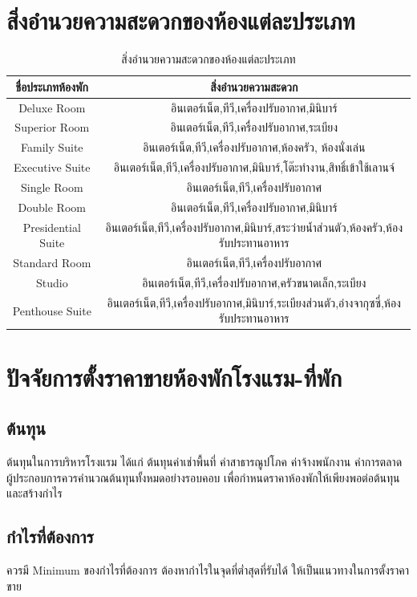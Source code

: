 \documentclass{report}
\begin{document}
\section{สิ่งอำนวยความสะดวกของห้องแต่ละประเภท}
\begin{table}[h!]
\centering
\begin{tabular}{|c|c|}
\hline
ชื่อประเภทห้องพัก & สิ่งอำนวยความสะดวก \\
\hline
Deluxe Room & อินเตอร์เน็ต,ทีวี,เครื่องปรับอากาศ,มินิบาร์  \\
Superior Room & อินเตอร์เน็ต,ทีวี,เครื่องปรับอากาศ,ระเบียง \\
Family Suite & อินเตอร์เน็ต,ทีวี,เครื่องปรับอากาศ,ห้องครัว, ห้องนั่งเล่น \\
Executive Suite & อินเตอร์เน็ต,ทีวี,เครื่องปรับอากาศ,มินิบาร์,โต๊ะทำงาน,สิทธิ์เข้าใช้เลานจ์ \\
Single Room & อินเตอร์เน็ต,ทีวี,เครื่องปรับอากาศ \\
Double Room & อินเตอร์เน็ต,ทีวี,เครื่องปรับอากาศ,มินิบาร์ \\
Presidential Suite & อินเตอร์เน็ต,ทีวี,เครื่องปรับอากาศ,มินิบาร์,สระว่ายน้ำส่วนตัว,ห้องครัว,ห้องรับประทานอาหาร \\
Standard Room & อินเตอร์เน็ต,ทีวี,เครื่องปรับอากาศ \\
Studio & อินเตอร์เน็ต,ทีวี,เครื่องปรับอากาศ,ครัวขนาดเล็ก,ระเบียง \\
Penthouse Suite & อินเตอร์เน็ต,ทีวี,เครื่องปรับอากาศ,มินิบาร์,ระเบียงส่วนตัว,อ่างจากุซซี่,ห้องรับประทานอาหาร \\
\hline
\end{tabular}
\caption{สิ่งอำนวยความสะดวกของห้องแต่ละประเภท}
\label{table:2}
\end{table}


\pagebreak

\section{ปัจจัยการตั้งราคาขายห้องพักโรงแรม-ที่พัก}
\subsection{ต้นทุน}
ต้นทุนในการบริหารโรงแรม ได้แก่ ต้นทุนค่าเช่าพื้นที่ ค่าสาธารณูปโภค ค่าจ้างพนักงาน ค่าการตลาด ผู้ประกอบการควรคำนวณต้นทุนทั้งหมดอย่างรอบคอบ เพื่อกำหนดราคาห้องพักให้เพียงพอต่อต้นทุนและสร้างกำไร
\subsection{กำไรที่ต้องการ}
ควรมี Minimum ของกำไรที่ต้องการ ต้องหากำไรในจุดที่ต่ำสุดที่รับได้ ให้เป็นแนวทางในการตั้งราคาขาย
\end{document}
